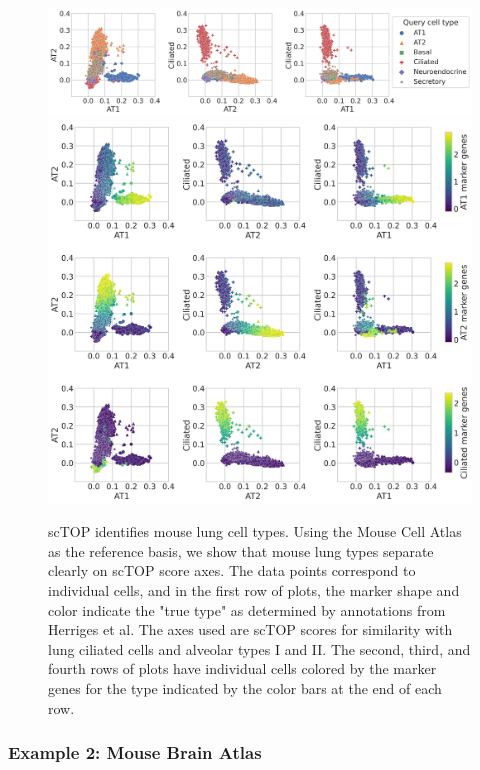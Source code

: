\documentclass[aps,superscriptaddress, notitlepage,longbibliography]{revtex4-1}
\begin{document}
\begin{figure}
	\centering
		\includegraphics[scale=0.45]{figs/herriges colored by type.png}
        \includegraphics[scale=0.5]{figs/herriges colored by signature.png}
	\caption{scTOP identifies mouse lung cell types. Using the Mouse Cell Atlas as the reference basis, we show that mouse lung types separate clearly on scTOP score axes. The data points correspond to individual cells, and in the first row of plots, the marker shape and color indicate the "true type" as determined by annotations from Herriges et al. The axes used are scTOP scores for similarity with lung ciliated cells and alveolar types I and II. The second, third, and fourth rows of plots have individual cells colored by the marker genes for the type indicated by the color bars at the end of each row.}
	\label{herriges}
\end{figure}

\subsubsection{Example 2: Mouse Brain Atlas}
\end{document}
